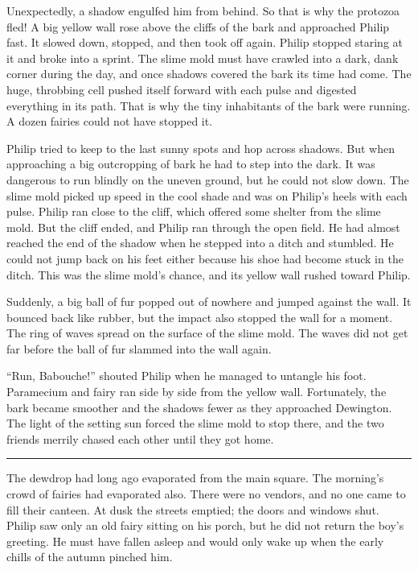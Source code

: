 \documentclass[10pt, draft]{memoir}
\renewcommand{\pfbreakdisplay}{\bigskip \ding{166} \bigskip}
\newcommand{\secbreak}{\fancybreak{\pfbreakdisplay}}
\begin{document}
Unexpectedly, a shadow engulfed him from behind. So that is why the protozoa
fled! A big yellow wall rose above the cliffs of the bark and approached Philip
fast. It slowed down, stopped, and then took off again. Philip stopped staring
at it and broke into a sprint. The slime mold must have crawled into a dark,
dank corner during the day, and once shadows covered the bark its time had
come. The huge, throbbing cell pushed itself forward with each pulse and
digested everything in its path. That is why the tiny inhabitants of the bark
were running. A dozen fairies could not have stopped it.

Philip tried to keep to the last sunny spots and hop across shadows. But when
approaching a big outcropping of bark he had to step into the dark. It was
dangerous to run blindly on the uneven ground, but he could not slow down. The
slime mold picked up speed in the cool shade and was on Philip's heels with
each pulse. Philip ran close to the cliff, which offered some shelter from the
slime mold. But the cliff ended, and Philip ran through the open field. He had
almost reached the end of the shadow when he stepped into a ditch and stumbled.
He could not jump back on his feet either because his shoe had become stuck in
the ditch. This was the slime mold's chance, and its yellow wall rushed toward
Philip.

Suddenly, a big ball of fur popped out of nowhere and jumped against the wall.
It bounced back like rubber, but the impact also stopped the wall for a moment.
The ring of waves spread on the surface of the slime mold. The waves did not
get far before the ball of fur slammed into the wall again.

``Run, Babouche!'' shouted Philip when he managed to untangle his foot.
Paramecium and fairy ran side by side from the yellow wall. Fortunately, the
bark became smoother and the shadows fewer as they approached Dewington. The
light of the setting sun forced the slime mold to stop there, and the two
friends merrily chased each other until they got home.

\secbreak

The dewdrop had long ago evaporated from the main square. The morning's crowd
of fairies had evaporated also. There were no vendors, and no one came to fill
their canteen. At dusk the streets emptied; the doors and windows shut. Philip
saw only an old fairy sitting on his porch, but he did not return the boy's
greeting. He must have fallen asleep and would only wake up when the early
chills of the autumn pinched him.
\end{document}
